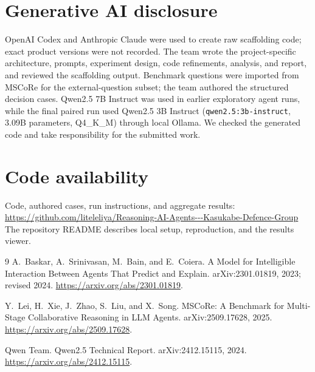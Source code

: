 \documentclass[11pt,a4paper,twocolumn]{article}
\newcommand{\githuburl}{https://github.com/liteleliya/Reasoning-AI-Agents---Kasukabe-Defence-Group}
\begin{document}
\section*{Generative AI disclosure}
OpenAI Codex and Anthropic Claude were used to create raw scaffolding code; exact product versions were not recorded. The team wrote the project-specific architecture, prompts, experiment design, code refinements, analysis, and report, and reviewed the scaffolding output. Benchmark questions were imported from MSCoRe for the external-question subset; the team authored the structured decision cases. Qwen2.5 7B Instruct was used in earlier exploratory agent runs, while the final paired run used Qwen2.5 3B Instruct (\texttt{qwen2.5:3b-instruct}, 3.09B parameters, Q4\_K\_M) through local Ollama. We checked the generated code and take responsibility for the submitted work.

\section*{Code availability}
\noindent Code, authored cases, run instructions, and aggregate results:\\
\url{\githuburl}\\
The repository README describes local setup, reproduction, and the results viewer.

\begin{thebibliography}{9}
\small
{}
A.~Baskar, A.~Srinivasan, M.~Bain, and E.~Coiera.
\newblock A Model for Intelligible Interaction Between Agents That Predict and Explain.
\newblock arXiv:2301.01819, 2023; revised 2024.
\newblock \url{https://arxiv.org/abs/2301.01819}.

Y.~Lei, H.~Xie, J.~Zhao, S.~Liu, and X.~Song.
\newblock MSCoRe: A Benchmark for Multi-Stage Collaborative Reasoning in LLM Agents.
\newblock arXiv:2509.17628, 2025.
\newblock \url{https://arxiv.org/abs/2509.17628}.

Qwen Team.
\newblock Qwen2.5 Technical Report.
\newblock arXiv:2412.15115, 2024.
\newblock \url{https://arxiv.org/abs/2412.15115}.
\end{thebibliography}
\end{document}
